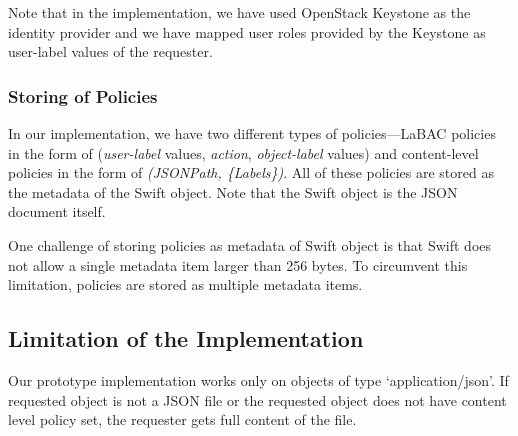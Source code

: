 Note that in the implementation,  we have used OpenStack Keystone \cite{keystone} as the identity provider and we have mapped user roles provided by the Keystone as user-label values of the requester.

\subsubsection{Storing of Policies}
	In our implementation, we have two different types of policies---LaBAC policies in the form of (\emph{user-label} values, \emph{action},  \emph{object-label} values) and content-level policies in the form of \emph{(JSONPath, \{Labels\})}. All of these policies are stored as the metadata of the Swift object. Note that the Swift object is the JSON document itself.
	
	One challenge of storing policies as metadata of Swift object is that Swift does not allow a single metadata item larger than 256 bytes. To circumvent this limitation, policies are stored as multiple metadata items.




\subsection{ Limitation of the Implementation}

	 Our prototype implementation works only on objects of type `application/json'. If requested object is not a JSON file or the requested object does not have content level policy set, the requester gets full content of the file.
	
